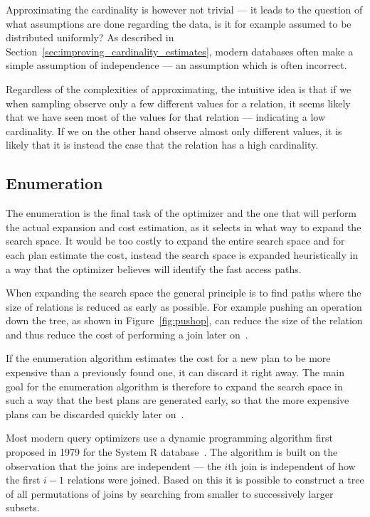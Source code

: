 Approximating the cardinality is however not trivial --- it leads to the question
of what assumptions are done regarding the data, is it for example assumed to be
distributed uniformly? As described in
Section~\ref{sec:improving_cardinality_estimates}, modern databases often make a
simple assumption of independence --- an assumption which is often incorrect.

Regardless of the complexities of approximating, the intuitive idea is that if
we when sampling observe only a few different values for a relation, it
seems likely that we have seen most of the values for that relation --- indicating
a low cardinality. If we on the other hand observe almost only different
values, it is likely that it is instead the case that the relation has a high
cardinality.

\subsection{Enumeration}
The enumeration is the final task of the optimizer and the one that will perform
the actual expansion and cost estimation, as it selects in what way to expand
the search space. It would be too costly to expand the entire search space and
for each plan estimate the cost, instead the search space is expanded
heuristically in a way that the optimizer believes will identify the fast access
paths.

When expanding the search space the general principle is to find paths where the
size of relations is reduced as early as possible. For example pushing an
operation down the tree, as shown in Figure~\ref{fig:pushop}, can reduce the
size of the relation and thus reduce the cost of performing a join later
on~\cite[p.~772-774]{garcia-molina_2002_database_dstcb}.

If the enumeration algorithm estimates the cost for a new plan to be more
expensive than a previously found one, it can discard it right away. The main
goal for the enumeration algorithm is therefore to expand the search space in
such a way that the best plans are generated early, so that the more expensive
plans can be discarded quickly later on~\cite{nica_2012_analyzing_aqoppojea}.

Most modern query optimizers use a dynamic programming algorithm first proposed
in 1979 for the System R database~\cite{selinger_1979_access_apsiardms}. The
algorithm is built on the observation that the joins are independent ---
the $i$th join is independent of how the first $i-1$ relations were
joined. Based on this it is possible to construct a tree of all permutations of
joins by searching from smaller to successively larger subsets.

